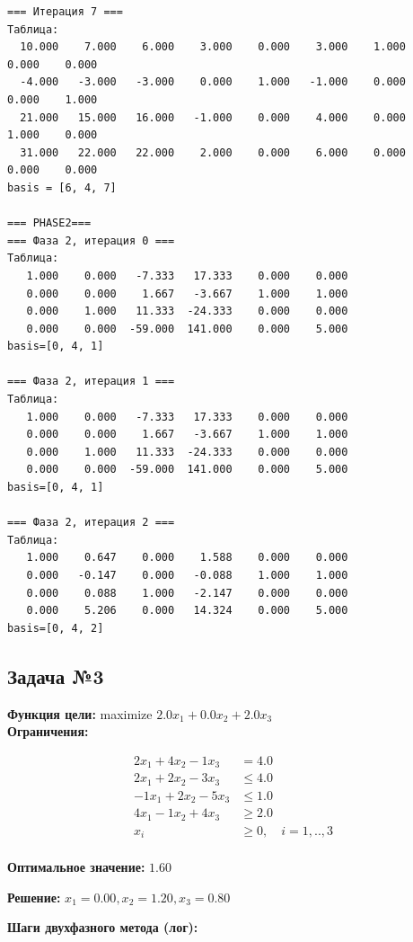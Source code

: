 \documentclass[a4paper,12pt]{article}
\begin{document}
\begin{verbatim}
=== Итерация 7 ===
Таблица:
  10.000    7.000    6.000    3.000    0.000    3.000    1.000    0.000    0.000
  -4.000   -3.000   -3.000    0.000    1.000   -1.000    0.000    0.000    1.000
  21.000   15.000   16.000   -1.000    0.000    4.000    0.000    1.000    0.000
  31.000   22.000   22.000    2.000    0.000    6.000    0.000    0.000    0.000
basis = [6, 4, 7]

=== PHASE2===
=== Фаза 2, итерация 0 ===
Таблица:
   1.000    0.000   -7.333   17.333    0.000    0.000
   0.000    0.000    1.667   -3.667    1.000    1.000
   0.000    1.000   11.333  -24.333    0.000    0.000
   0.000    0.000  -59.000  141.000    0.000    5.000
basis=[0, 4, 1]

=== Фаза 2, итерация 1 ===
Таблица:
   1.000    0.000   -7.333   17.333    0.000    0.000
   0.000    0.000    1.667   -3.667    1.000    1.000
   0.000    1.000   11.333  -24.333    0.000    0.000
   0.000    0.000  -59.000  141.000    0.000    5.000
basis=[0, 4, 1]

=== Фаза 2, итерация 2 ===
Таблица:
   1.000    0.647    0.000    1.588    0.000    0.000
   0.000   -0.147    0.000   -0.088    1.000    1.000
   0.000    0.088    1.000   -2.147    0.000    0.000
   0.000    5.206    0.000   14.324    0.000    5.000
basis=[0, 4, 2]

\end{verbatim}



\subsection*{Задача №3}
\textbf{Функция цели: }
maximize $ 2.0x_{1} +0.0x_{2} +2.0x_{3} $\\

\textbf{Ограничения:}

\[ \begin{aligned}
2x_{1} +4x_{2} -1x_{3} &= 4.0 \\
2x_{1} +2x_{2} -3x_{3} &\le 4.0 \\
-1x_{1} +2x_{2} -5x_{3} &\le 1.0 \\
4x_{1} -1x_{2} +4x_{3} &\ge 2.0 \\
x_i &\ge 0,\quad i=1,..,3\\
\end{aligned}\]

\textbf{Оптимальное значение: }$1.60$

\textbf{Решение: }$x_{1}=0.00, x_{2}=1.20, x_{3}=0.80$

\textbf{Шаги двухфазного метода (лог):}
\end{document}
